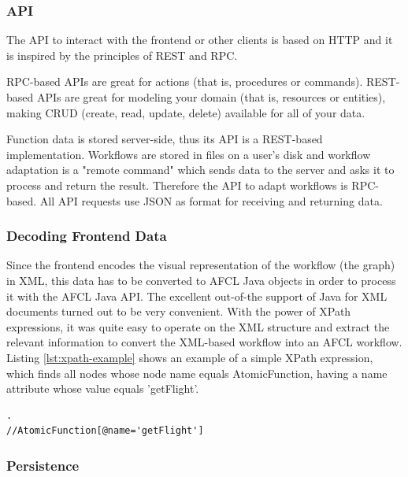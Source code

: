 \documentclass[a4paper,top=25mm,bottom=25mm,12pt,pdftex,halfparskip,twoside,bibtotoc,numbers=noenddot]{scrbook}
\begin{document}
\subsubsection{API}
 
The API to interact with the frontend or other clients is based on HTTP and it is inspired by the principles of REST and RPC.

RPC-based APIs are great for actions (that is, procedures or commands).
REST-based APIs are great for modeling your domain (that is, resources or entities), making CRUD (create, read, update, delete) available for all of your data. \cite{online-smashingmagazine-rest-vs-rpc}

Function data is stored server-side, thus its API is a REST-based implementation. Workflows are stored in files on a user's disk and workflow adaptation is a "remote command" which sends data to the server and asks it to process and return the result. Therefore the API to adapt workflows is RPC-based. All API requests use JSON as format for receiving and returning data.

\subsubsection{Decoding Frontend Data}
\label{sec:backend-decoding}

Since the frontend encodes the visual representation of the workflow (the graph) in XML, this data has to be converted to AFCL Java objects in order to process it with the AFCL Java API.
The excellent out-of-the support of Java for XML documents turned out to be very convenient. With the power of XPath expressions, it was quite easy to operate on the XML structure and extract the relevant information to convert the XML-based workflow into an AFCL workflow. Listing \ref{lst:xpath-example} shows an example of a simple XPath expression, which finds all nodes whose node name equals \textsf{AtomicFunction}, having a \textsf{name} attribute whose value equals 'getFlight'.

\vspace{0.25cm}
\begin{lstlisting}[caption={Example of an XPath expression.},label={lst:xpath-example}].
//AtomicFunction[@name='getFlight']
\end{lstlisting}

\subsubsection{Persistence}
\label{sec:backend-persistence}
\end{document}
